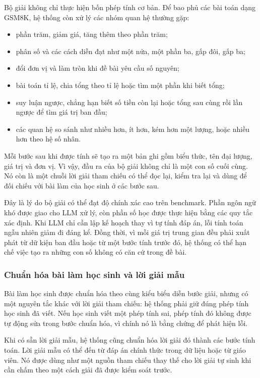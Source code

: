 \documentclass[12pt,a4paper]{article}
\begin{document}
Bộ giải không chỉ thực hiện bốn phép tính cơ bản. Để bao phủ các bài toán dạng
GSM8K, hệ thống còn xử lý các nhóm quan hệ thường gặp:

\begin{itemize}[leftmargin=*]
    \item phần trăm, giảm giá, tăng thêm theo phần trăm;
    \item phân số và các cách diễn đạt như một nửa, một phần ba, gấp đôi, gấp ba;
    \item đổi đơn vị và làm tròn khi đề bài yêu cầu số nguyên;
    \item bài toán tỉ lệ, chia tổng theo tỉ lệ hoặc tìm một phần khi biết tổng;
    \item suy luận ngược, chẳng hạn biết số tiền còn lại hoặc tổng sau cùng rồi
    lần ngược để tìm giá trị ban đầu;
    \item các quan hệ so sánh như nhiều hơn, ít hơn, kém hơn một lượng, hoặc
    nhiều hơn theo hệ số nhân.
\end{itemize}

Mỗi bước sau khi được tính sẽ tạo ra một bản ghi gồm biểu thức, tên đại lượng,
giá trị và đơn vị. Vì vậy, đầu ra của bộ giải không chỉ là một con số cuối cùng.
Nó còn là một chuỗi lời giải tham chiếu có thể đọc lại, kiểm tra lại và dùng để
đối chiếu với bài làm của học sinh ở các bước sau.

Đây là lý do bộ giải có thể đạt độ chính xác cao trên benchmark. Phần ngôn ngữ
khó được giao cho LLM xử lý, còn phần số học được thực hiện bằng các quy tắc xác
định. Khi LLM chỉ cần lập kế hoạch thay vì tự tính đáp án, lỗi tính toán ngẫu
nhiên giảm đi đáng kể. Đồng thời, vì mỗi giá trị trung gian đều phải xuất phát
từ dữ kiện ban đầu hoặc từ một bước tính trước đó, hệ thống có thể hạn chế việc
tạo ra những con số không có căn cứ trong đề bài.

\subsubsection{Chuẩn hóa bài làm học sinh và lời giải mẫu}

Bài làm học sinh được chuẩn hóa theo cùng kiểu biểu diễn bước giải, nhưng có một
nguyên tắc khác với lời giải tham chiếu: hệ thống phải giữ đúng phép tính học
sinh đã viết. Nếu học sinh viết một phép tính sai, phép tính đó không được tự
động sửa trong bước chuẩn hóa, vì chính nó là bằng chứng để phát hiện lỗi.

Khi có sẵn lời giải mẫu, hệ thống cũng chuẩn hóa lời giải đó thành các bước tính
toán. Lời giải mẫu có thể đến từ đáp án chính thức trong dữ liệu hoặc từ giáo
viên. Nó được dùng như một nguồn tham chiếu thay thế cho lời giải tự sinh khi
cần chấm theo một cách giải đã được kiểm soát trước.
\end{document}
